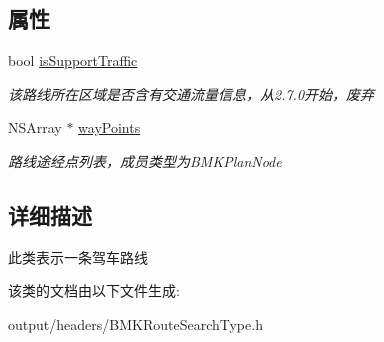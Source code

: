\subsection*{属性}
\begin{DoxyCompactItemize}
\item 
\hypertarget{interface_b_m_k_driving_route_line_a23c30bf764fd27531e7f7d1e1cb1d6b4}{}bool \hyperlink{interface_b_m_k_driving_route_line_a23c30bf764fd27531e7f7d1e1cb1d6b4}{is\+Support\+Traffic}\label{interface_b_m_k_driving_route_line_a23c30bf764fd27531e7f7d1e1cb1d6b4}

\begin{DoxyCompactList}\small\item\em 该路线所在区域是否含有交通流量信息，从2.7.\+0开始，废弃 \end{DoxyCompactList}\item 
\hypertarget{interface_b_m_k_driving_route_line_a577c5a10368ef9c18ac73f20836092bd}{}N\+S\+Array $\ast$ \hyperlink{interface_b_m_k_driving_route_line_a577c5a10368ef9c18ac73f20836092bd}{way\+Points}\label{interface_b_m_k_driving_route_line_a577c5a10368ef9c18ac73f20836092bd}

\begin{DoxyCompactList}\small\item\em 路线途经点列表，成员类型为\+B\+M\+K\+Plan\+Node \end{DoxyCompactList}\end{DoxyCompactItemize}


\subsection{详细描述}
此类表示一条驾车路线 

该类的文档由以下文件生成\+:\begin{DoxyCompactItemize}
\item 
output/headers/B\+M\+K\+Route\+Search\+Type.\+h\end{DoxyCompactItemize}
